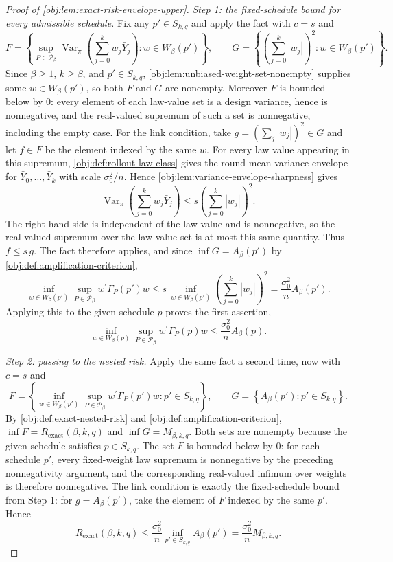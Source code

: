 \begin{proof}[Proof of \cref{obj:lem:exact-risk-envelope-upper}]
\emph{Step 1: the fixed-schedule bound for every admissible schedule.}
Fix any \(p'\in S_{k,q}\) and apply the fact with \(c=s\) and
\[
F=\left\{
\sup_{P\in\mathcal P_\beta}
\operatorname{Var}_\pi\!\left(\sum_{j=0}^k w_j\bar Y_j\right):
w\in W_\beta(p')
\right\},
\qquad
G=\left\{
\left(\sum_{j=0}^k |w_j|\right)^2:
w\in W_\beta(p')
\right\}.
\]
Since \(\beta\ge1\), \(k\ge\beta\), and \(p'\in S_{k,q}\), \cref{obj:lem:unbiased-weight-set-nonempty} supplies some \(w\in W_\beta(p')\), so both \(F\) and \(G\) are nonempty. %
Moreover \(F\) is bounded below by \(0\): every element of each law-value set is a design variance, hence is nonnegative, and the real-valued supremum of such a set is nonnegative, including the empty case. %
For the link condition, take \(g=\left(\sum_j|w_j|\right)^2\in G\) and let \(f\in F\) be the element indexed by the same \(w\). For every law value appearing in this supremum, \cref{obj:def:rollout-law-class} gives the round-mean variance envelope for \(\bar Y_0,\ldots,\bar Y_k\) with scale \(\sigma_0^2/n\). Hence \cref{obj:lem:variance-envelope-sharpness} gives
\[
\operatorname{Var}_\pi\!\left(\sum_{j=0}^k w_j\bar Y_j\right)
\le
s\left(\sum_{j=0}^k |w_j|\right)^2 .
\]
The right-hand side is independent of the law value and is nonnegative, so the real-valued supremum over the law-value set is at most this same quantity. Thus \(f\le s\,g\). %
The fact therefore applies, and since \(\inf G=A_\beta(p')\) by \cref{obj:def:amplification-criterion},
\[
\inf_{w\in W_\beta(p')}
\sup_{P\in\mathcal P_\beta}
w^\prime\Gamma_P(p')w
\le
s\,
\inf_{w\in W_\beta(p')}
\left(\sum_{j=0}^k |w_j|\right)^2
=
\frac{\sigma_0^2}{n}A_\beta(p').
\]
Applying this to the given schedule \(p\) proves the first assertion,
\[
\inf_{w\in W_\beta(p)}
\sup_{P\in\mathcal P_\beta}
w^\prime\Gamma_P(p)w
\le
\frac{\sigma_0^2}{n}A_\beta(p).
\]

\emph{Step 2: passing to the nested risk.}
Apply the same fact a second time, now with \(c=s\) and
\[
F=\left\{
\inf_{w\in W_\beta(p')}
\sup_{P\in\mathcal P_\beta}
w^\prime\Gamma_P(p')w:
p'\in S_{k,q}
\right\},
\qquad
G=\left\{A_\beta(p'):p'\in S_{k,q}\right\}.
\]
By \cref{obj:def:exact-nested-risk} and \cref{obj:def:amplification-criterion}, \(\inf F=R_{\mathrm{exact}}(\beta,k,q)\) and \(\inf G=M_{\beta,k,q}\). Both sets are nonempty because the given schedule satisfies \(p\in S_{k,q}\). The set \(F\) is bounded below by \(0\): for each schedule \(p'\), every fixed-weight law supremum is nonnegative by the preceding nonnegativity argument, and the corresponding real-valued infimum over weights is therefore nonnegative. The link condition is exactly the fixed-schedule bound from Step 1: for \(g=A_\beta(p')\), take the element of \(F\) indexed by the same \(p'\). Hence
\[
R_{\mathrm{exact}}(\beta,k,q)
\le
\frac{\sigma_0^2}{n}
\inf_{p'\in S_{k,q}} A_\beta(p')
=
\frac{\sigma_0^2}{n}M_{\beta,k,q}.
\]
\end{proof}
